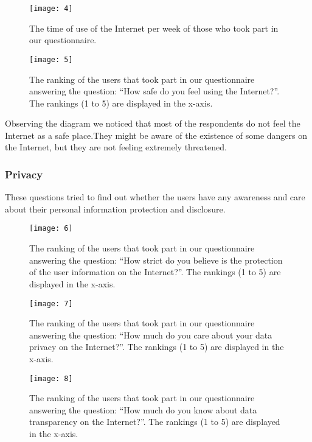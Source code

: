 \begin{figure}[hp]
\centering
\texttt{[image: 4]}
\caption{The time of use of the Internet per week of those who took part in our 
questionnaire.}
\end{figure}

\begin{figure}[hp]
\centering
\texttt{[image: 5]}
\caption{The ranking of the users that took part in our questionnaire answering 
the question: ``How safe do you feel using the Internet?''. The rankings (1 to 5) 
are displayed in the x-axis.}
\end{figure}

Observing the diagram we noticed that most of the respondents  do not feel the 
Internet as a safe place.They might be  aware of the existence of some dangers 
on the Internet, but they are not feeling extremely threatened.

\subsubsection{Privacy}

These questions tried to find out whether the users have any awareness and care 
about their personal information protection and disclosure.

\begin{figure}[hp]
\centering
\texttt{[image: 6]}
\caption{The ranking of the users that took part in our questionnaire answering
the question: ``How strict do you believe is the protection of the user 
information on the Internet?''. The rankings (1 to 5) are displayed in the 
x-axis.}
\end{figure}

\begin{figure}[hp]
\centering
\texttt{[image: 7]}
\caption{The ranking of the users that took part in our questionnaire answering
the question: ``How much do you care about your data privacy on the Internet?''. 
The rankings (1 to 5) are displayed in the x-axis.}
\end{figure}

\begin{figure}[hp]
\centering
\texttt{[image: 8]}
\caption{The ranking of the users that took part in our questionnaire answering
the question: ``How much do you know about data transparency on the Internet?''. 
The rankings (1 to 5) are displayed in the x-axis.}
\end{figure}

